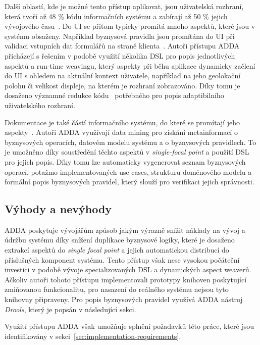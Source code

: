 Další oblastí, kde je možné tento přístup aplikovat, jsou uživatelská rozhraní,
která tvoří až 48 \% kódu informačních systému a zabírají až 50 \%
jejich vývojového času~\cite{kennard2009separation}.
Do \gls{UI} se přitom typicky promítá mnoho aspektů, které jsou
v systému obsaženy. Například byznysová pravidla jsou promítána do \gls{UI}
při validaci vstupních dat formulářů na straně klienta~\cite{cemus2017separation}.
Autoři přístupu \gls{ADDA} přicházejí s řešením v podobě
využití několika \gls{DSL} pro popis jednotlivých aspektů
a run-time weavingu, který aspekty při běhu aplikace
dynamicky začlení do \gls{UI} s ohledem na aktuální kontext
uživatele, například na jeho geolokační polohu či velikost
displeje, na kterém je rozhraní zobrazováno.
Díky tomu je dosaženo významné redukce kódu~\cite{cemus2016context}
potřebného pro popis adaptibilního uživatelského rozhraní.

Dokumentace je také částí informačního systému, do které se promítají
jeho aspekty~\cite{cemus2017automated}. Autoři \gls{ADDA}
využívají data mining pro získání metainformací o byznysových operacích,
datovém modelu systému a o byznysových pravidlech. To je umožněno
díky soustředění těchto aspektů v \textit{single-focal point} a použití \gls{DSL} pro jejich popis.
Díky tomu lze automaticky vygenerovat seznam byznysových operací, potažmo implementovaných
use-cases, strukturu doménového modelu a formální popis byznysových pravidel,
který slouží pro verifikaci jejich správnosti.

\subsection{Výhody a nevýhody}

\gls{ADDA} poskytuje vývojářům způsob jakým výrazně snížit náklady na vývoj a údržbu
systému díky snížení duplikace byznysové logiky, které je dosaženo extrakcí aspektů
do \textit{single focal point} a jejich automatickou distribucí do příslušných komponent
systému. Tento přístup však nese vysokou počáteční investici v podobě vývoje specializovaných
\gls{DSL} a dynamických aspect weaverů. Ačkoliv autoři tohoto přístupu implementovali prototypy
knihoven poskytující zmiňovanou funkcionalitu, pro nasazení do reálného systému nejsou tyto
knihovny připraveny. Pro popis byznysových pravidel využívá \gls{ADDA} nástroj \textit{Drools},
který je popsán v následující sekci.

Využití přístupu \gls{ADDA} však umožňuje splnění požadavků této práce, které jsou identifikovány
v sekci~\ref{sec:implementation-requirements}.


